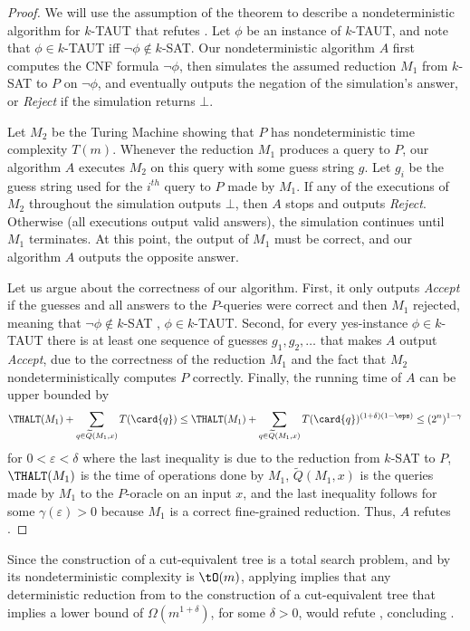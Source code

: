 \begin{proof}
We will use the assumption of the theorem to describe a nondeterministic algorithm for $k$-TAUT that refutes \NSETH.
Let $\phi$ be an instance of $k$-TAUT, and note that $\phi \in k$-TAUT iff $\neg \phi \notin k$-SAT.
Our nondeterministic algorithm $A$ first computes the CNF formula $\neg \phi$, then simulates the assumed reduction $M_1$ from $k$-SAT to $P$ on $\neg \phi$, and eventually outputs the negation of the simulation's answer, or \textsl{Reject} if the simulation returns $\bot$.

Let $M_2$ be the Turing Machine showing that $P$ has nondeterministic time complexity $T(m)$.
Whenever the reduction $M_1$ produces a query to $P$, our algorithm $A$ executes $M_2$ on this query with some guess string $g$. Let $g_i$ be the guess string used for the $i^{th}$ query to $P$ made by $M_1$. If any of the executions of $M_2$ throughout the simulation outputs $\bot$, then $A$ stops and outputs \textsl{Reject}. Otherwise (all executions output valid answers), the simulation continues until $M_1$ terminates. At this point, the output of $M_1$ must be correct, and our algorithm $A$ outputs the opposite answer.

Let us argue about the correctness of our algorithm. First, it only outputs \textsl{Accept} if the guesses and all answers to the $P$-queries were correct and then $M_1$ rejected, meaning that $\neg \phi \notin k$-SAT \ie, $\phi \in k$-TAUT.
Second, for every yes-instance $\phi \in k$-TAUT there is at least one sequence of guesses $g_1,g_2,\ldots$ that makes $A$ output \textsl{Accept}, due to the correctness of the reduction $M_1$ and the fact that $M_2$ nondeterministically computes $P$ correctly.
Finally, the running time of $A$ can be upper bounded by
%
$$
\THALT(M_1) + \sum_{q\in \widetilde{Q}(M_1,x)}T(\card{q}) \leq \THALT(M_1)
+\sum_{q\in \widetilde{Q}(M_1,x)}T(\card{q})^{(1+\delta)(1-\eps)}\leq (2^n)^{1-\gamma}
$$
for $0<\varepsilon<\delta$ where the last inequality is due to the reduction from $k$-SAT to $P$, $\THALT(M_1)$ is the time of operations done by $M_1$,
%
$\widetilde{Q}(M_1,x)$
is the queries made by $M_1$ to the $P$-oracle on an input $x$, and the last inequality follows for some $\gamma(\varepsilon)>0$ because $M_1$ is a correct fine-grained reduction.
Thus, $A$ refutes \NSETH.
\end{proof}

Since the construction of a cut-equivalent tree is a total search problem, and by  its nondeterministic complexity is $\tO(m)$, applying  implies that any deterministic reduction from \SETH to the construction of a cut-equivalent tree that implies a lower bound of $\Omega(m^{1+\delta})$, for some $\delta>0$, would refute \NSETH, concluding .

